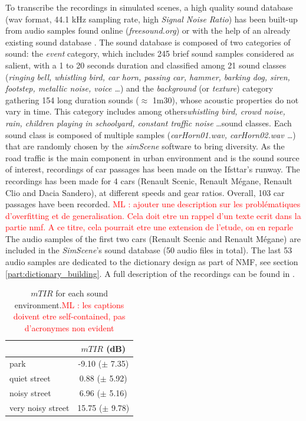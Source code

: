 \documentclass[review,5p,twocolumn,sort&compress,times]{elsarticle}
\newcommand{\ml}[1]{\textcolor{red}{ML : #1}}
\begin{document}
To transcribe the recordings in simulated scenes, a high quality sound database (wav format, 44.1 kHz sampling rate, high \textit{Signal Noise Ratio}) has been built-up from audio samples found online (\textit{freesound.org}) or with the help of an already existing sound database \cite{salamon2014dataset}. The sound database is composed of two categories of sound: the \textit{event} category, which includes 245 brief sound samples considered as salient, with a 1 to 20 seconds duration and classified among 21 sound classes (\textit{ringing bell, whistling bird, car horn, passing car, hammer, barking dog, siren, footstep, metallic noise, voice \dots}) and the \textit{background} (or \textit{texture}) category gathering 154 long duration sounds ($\approx$ 1m30), whose acoustic properties do not vary in time. This category includes among others\textit{whistling bird, crowd noise, rain, children playing in schoolyard, constant traffic noise} \dots sound classes. Each sound class is composed of multiple samples (\textit{carHorn01.wav, carHorn02.wav \dots}) that are randomly chosen by the \textit{simScene} software to bring diversity.
As the road traffic is the main component in urban environment and is the sound source of interest, recordings of car passages has been made on the Ifsttar's runway. The recordings has been made for 4 cars (Renault Scenic, Renault M\'egane, Renault Clio and Dacia Sandero),  at different speeds and gear ratios. Overall, 103 car passages have been recorded. \ml{ajouter une description sur les problématiques d'overfitting et de generalisation. Cela doit etre un rappel d'un texte ecrit dans la partie nmf. A ce titre, cela pourrait etre une extension de l'etude, on en reparle} The audio samples of the first two cars (Renault Scenic and Renault M\'egane) are included in the \textit{SimScene}'s sound database (50 audio files in total). The last 53 audio samples are dedicated to the dictionary design as part of NMF, see section \ref{part:dictionary_building}. A full description of the recordings can be found in \cite{gloaguen_creation_2017}.

\begin{table}[t]
\centering
\caption{$mTIR$ for each sound environment.\ml{les captions doivent etre self-contained, pas d'acronymes non evident}}
\begin{tabular}{lc}
 & $mTIR$ (dB)\\ \hline
 park & -9.10 ($\pm$ 7.35) \\
 quiet street & 0.88 ($\pm$ 5.92) \\
 noisy street & 6.96 ($\pm$ 5.16) \\
 very noisy street & 15.75 ($\pm$ 9.78) \\ \hline
\end{tabular}
\label{tab:mTIR}
\end{table}
\end{document}
